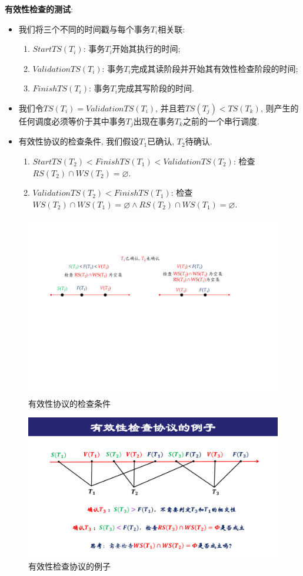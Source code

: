 \textbf{有效性检查的测试}:
\begin{itemize}
  \item 我们将三个不同的时间戳与每个事务$T_i$相关联:
  \begin{enumerate}
      \item $StartTS(T_i)$: 事务$T_i$开始其执行的时间;
      \item $ValidationTS(T_i)$: 事务$T_i$完成其读阶段并开始其有效性检查阶段的时间;
      \item $FinishTS(T_i)$: 事务$T_i$完成其写阶段的时间.
  \end{enumerate}
  \item 我们令$TS(T_i)=ValidationTS(T_i)$, 并且若$TS(T_j)<TS(T_k)$, 则产生的任何调度必须等价于其中事务$T_j$出现在事务$T_k$之前的一个串行调度.
  \item 有效性协议的检查条件, 我们假设$T_1$已确认, $T_2$待确认.
  \begin{enumerate}
      \item $StartTS(T_2)<FinishTS(T_1)<ValidationTS(T_2)$: 检查$RS(T_2)\cap WS(T_2) = \varnothing$. 
      \item $ValidationTS(T_2)<FinishTS(T_1)$: 检查$WS(T_2)\cap WS(T_1) = \varnothing \land RS(T_2) \cap WS(T_1) = \varnothing$.
  \end{enumerate}
\end{itemize}

\begin{figure}[H]
    \centering
    \includegraphics[width=.8\textwidth]{figure/有效性.pdf}
    \caption{有效性协议的检查条件}
\end{figure}

\begin{figure}[H]
    \centering
    \includegraphics[width=.7\textwidth]{figure/有效性-例子.pdf}
    \caption{有效性检查协议的例子}
\end{figure}

